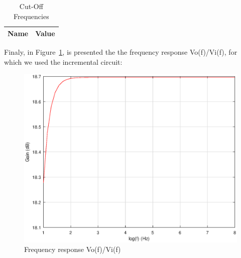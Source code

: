 \begin{table}[H]
  \centering
  \begin{tabular}{|l|r|}
     \hline    
    {\bf Name} & {\bf Value} \\ \hline   
    
  \end{tabular}
  \caption{Cut-Off Frequencies}
  \label{tab:lc}
\end{table}

Finaly, in Figure~\ref{fig:gainoct}, is presented the the frequency response Vo(f)/Vi(f), for which we used the incremental circuit:

\begin{figure}[H] \centering
\includegraphics[width=0.4\linewidth]{Gain.eps}
\caption{Frequency response Vo(f)/Vi(f)}
\label{fig:gainoct}
\end{figure}

